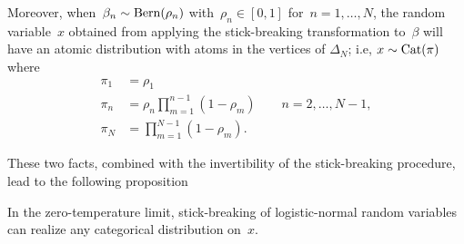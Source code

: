   Moreover, when~${\beta_n \sim \mathrm{Bern}(\rho_n)}$
  with~${\rho_n \in [0,1]}$ for~${n=1, \ldots, N}$, the random
  variable~$x$ obtained from applying the stick-breaking
  transformation to~$\beta$ will have an atomic distribution with atoms
  in the vertices of $\Delta_{N}$; i.e,
  ${x \sim \mathrm{Cat}(\pi)}$ where
  \begin{align*}
    \pi_1 &= \rho_1 \\
    \pi_n &=  \rho_n \prod_{m=1}^{n-1} (1-\rho_m)  \qquad
          n=2, \ldots, N-1, \\
    \pi_N &= \prod_{m=1}^{N-1} (1-\rho_m).
\end{align*}


These two facts, combined with the invertibility of the
stick-breaking procedure, lead to the following proposition

\begin{proposition}
  In the zero-temperature limit, stick-breaking of logistic-normal
  random variables can realize any categorical distribution on~$x$.
\end{proposition}


